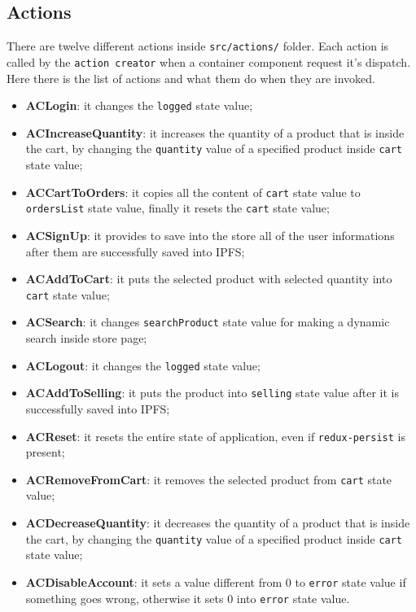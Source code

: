 \subsection{Actions}
There are twelve different actions inside \texttt{src/actions/} folder. Each action is called by the \texttt{action creator} when a container component request it's dispatch. Here there is the list of actions and what them do when they are invoked.
\begin{itemize}
	\item \textbf{ACLogin}: it changes the \texttt{logged} state value;
	\item \textbf{ACIncreaseQuantity}: it increases the quantity of a product that is inside the cart, by changing the \texttt{quantity} value of a specified product inside \texttt{cart} state value;
	\item \textbf{ACCartToOrders}: it copies all the content of \texttt{cart} state value to \texttt{ordersList} state value, finally it resets the \texttt{cart} state value;
	\item \textbf{ACSignUp}: it provides to save into the store all of the user informations after them are successfully saved into IPFS;
	\item \textbf{ACAddToCart}: it puts the selected product with selected quantity into \texttt{cart} state value;
	\item \textbf{ACSearch}: it changes \texttt{searchProduct} state value for making a dynamic search inside store page;
	\item \textbf{ACLogout}: it changes the \texttt{logged} state value;
	\item \textbf{ACAddToSelling}: it puts the product into \texttt{selling} state value after it is successfully saved into IPFS;
	\item \textbf{ACReset}: it resets the entire state of application, even if \texttt{redux-persist} is present;
	\item \textbf{ACRemoveFromCart}: it removes the selected product from \texttt{cart} state value;
	\item \textbf{ACDecreaseQuantity}: it decreases the quantity of a product that is inside the cart, by changing the \texttt{quantity} value of a specified product inside \texttt{cart} state value;
	\item \textbf{ACDisableAccount}: it sets a value different from 0 to \texttt{error} state value if something goes wrong, otherwise it sets 0 into \texttt{error} state value.
\end{itemize}

